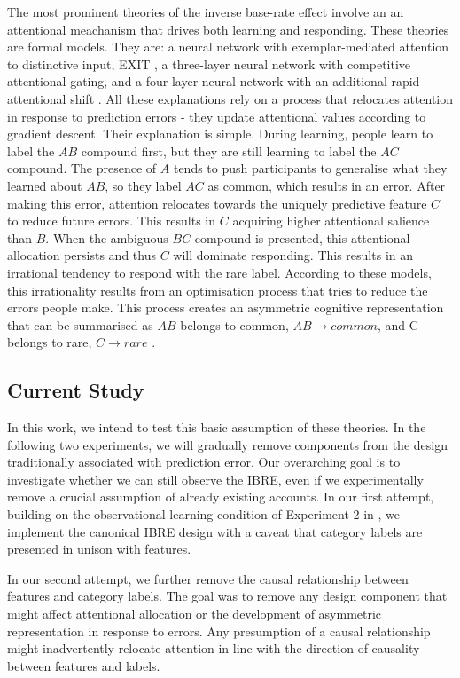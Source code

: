 \documentclass[10pt,letterpaper]{article}
\begin{document}
The most prominent theories of the inverse base-rate effect involve an an attentional meachanism that drives both learning and responding.
These theories are formal models.
They are: a neural network with exemplar-mediated attention to distinctive input, EXIT \cite{kruschke2001toward}, a three-layer neural network with competitive attentional gating, and a four-layer neural network with an additional rapid attentional shift \cite{paskewitz2020dissecting}.
All these explanations rely on a process that relocates attention in response to prediction errors - they update attentional values according to gradient descent.
Their explanation is simple.
During learning, people learn to label the $AB$ compound first, but they are still learning to label the $AC$ compound.
The presence of $A$ tends to push participants to generalise what they learned about $AB$, so they label $AC$ as common, which results in an error.
After making this error, attention relocates towards the uniquely predictive feature $C$ to reduce future errors.
This results in $C$ acquiring higher attentional salience than $B$.
When the ambiguous $BC$ compound is presented, this attentional allocation persists and thus $C$ will dominate responding.
This results in an irrational tendency to respond with the rare label.
According to these models, this irrationality results from an optimisation process that tries to reduce the errors people make.
This process creates an asymmetric cognitive representation that can be summarised as $AB$ belongs to common, $AB \to common$, and C belongs to rare, $C \to rare$ \cite{kruschke2001inverse}.

\subsection{Current Study}

In this work, we intend to test this basic assumption of these theories.
In the following two experiments, we will gradually remove components from the design traditionally associated with prediction error.
Our overarching goal is to investigate whether we can still observe the IBRE, even if we experimentally remove a crucial assumption of already existing accounts.
In our first attempt, building on the observational learning condition of Experiment 2 in , we implement the canonical IBRE design with a caveat that category labels are presented in unison with features.

In our second attempt, we further remove the causal relationship between features and category labels.
The goal was to remove any design component that might affect attentional allocation or the development of asymmetric representation in response to errors.
Any presumption of a causal relationship might inadvertently relocate attention in line with the direction of causality between features and labels.
\end{document}
